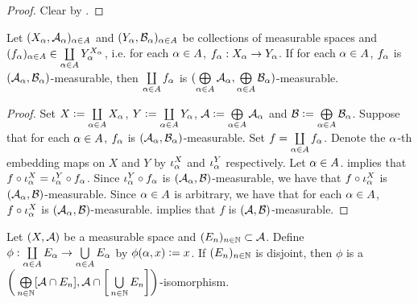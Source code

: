 \documentclass{book}
\begin{document}
	\begin{proof}
		Clear by .
	\end{proof}
	
	\begin{ex} 
		Let $(X_{\alpha}, \mathcal{A}_{\alpha})_{\alpha \in A}$ and $(Y_{\alpha}, \mathcal{B}_{\alpha})_{\alpha \in A}$ be collections of measurable spaces and $(f_{\alpha})_{\alpha \in A} \in \coprod\limits_{\alpha \in A} Y_{\alpha}^{X_{\alpha}}$, i.e. for each $\alpha \in A$, $f_{\alpha}:X_{\alpha} \rightarrow Y_{\alpha}$. If for each $\alpha \in A$, $f_{\alpha}$ is $(\mathcal{A}_{\alpha}, \mathcal{B}_{\alpha})$-measurable, then $\coprod\limits_{\alpha \in A} f_{\alpha}$ is $(\bigoplus\limits_{\alpha \in A} \mathcal{A}_{\alpha}, \bigoplus\limits_{\alpha \in A} \mathcal{B}_{\alpha})$-measurable.
	\end{ex}
	
	\begin{proof} 
		Set $X \vcentcolon= \coprod\limits_{\alpha \in A} X_{\alpha}$, $Y \vcentcolon= \coprod\limits_{\alpha \in A}Y_{\alpha}$, $\mathcal{A} \vcentcolon= \bigoplus\limits_{\alpha \in A} \mathcal{A}_{\alpha}$ and $\mathcal{B} \vcentcolon= \bigoplus\limits_{\alpha \in A} \mathcal{B}_{\alpha}$. Suppose that for each $\alpha \in A$, $f_{\alpha}$ is $(\mathcal{A}_{\alpha}, \mathcal{B}_{\alpha})$-measurable. Set $f = \coprod\limits_{\alpha \in A} f_{\alpha}$. Denote the $\alpha$-th embedding maps on $X$ and $Y$ by $\iota^X_{\alpha}$ and $\iota^Y_{\alpha}$ respectively. Let $\alpha \in A$.  implies that $f \circ \iota^X_{\alpha} = \iota^Y_{\alpha} \circ f_{\alpha}$. Since $\iota^Y_{\alpha} \circ f_{\alpha}$ is $(\mathcal{A}_{\alpha}, \mathcal{B})$-measurable, we have that $f \circ \iota^X_{\alpha}$ is $(\mathcal{A}_{\alpha}, \mathcal{B})$-measurable. Since $\alpha \in A$ is arbitrary, we have that for each $\alpha \in A$, $f \circ \iota^X_{\alpha}$ is $(\mathcal{A}_{\alpha}, \mathcal{B})$-measurable.  implies that $f$ is $(\mathcal{A}, \mathcal{B})$-measurable.
	\end{proof}
	
	\begin{ex} 
		Let $(X, \mathcal{A})$ be a measurable space and $(E_{n})_{n \in \mathbb{N}} \subset \mathcal{A}$. Define $\phi: \coprod\limits_{\alpha \in A} E_{\alpha} \rightarrow \bigcup\limits_{\alpha \in A} E_{\alpha}$ by $\phi(\alpha, x) \vcentcolon= x$. If $(E_{n})_{n \in \mathbb{N}}$ is disjoint, then $\phi$ is a $\bigg( \bigoplus\limits_{n \in \mathbb{N}} [\mathcal{A} \cap E_n], \mathcal{A} \cap \bigg[\bigcup\limits_{n \in \mathbb{N}} E_n \bigg] \bigg)$-isomorphism. 
	\end{ex}
	
\end{document}

